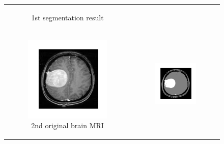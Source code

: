 \documentclass[a4paper]{article}
\begin{document}
\begin{figure}[h!]
{\begin{tabular}{c@{}c}
\begin{subfigure}[b]{.35\columnwidth}
        \caption{{\small 1st segmentation result}}
    \end{subfigure}\\
    \begin{subfigure}[t]{.35\columnwidth}   
        \centering 
        \includegraphics[width=\textwidth]{../Cluster_results/MRI_multi/2nd.png}%
        \caption{{\small 2nd original brain MRI}}
        \label{fig:mean and std of net34}
    \end{subfigure}&
    \begin{subfigure}[t]{.35\columnwidth}   
        \centering 
        \includegraphics[width=\columnwidth]{../Cluster_results/MRI_multi/2nd_seg.png}%

\end{subfigure}
\end{tabular}}
\end{figure}
\end{document}
